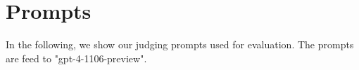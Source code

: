 \documentclass[11pt]{article}
\begin{document}
\section{Prompts} \label{sec:prompt}

In the following, we show our judging prompts used for evaluation. The prompts are feed to "gpt-4-1106-preview".






\end{document}

